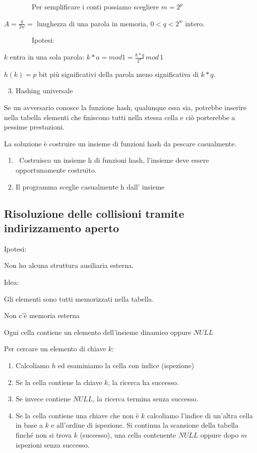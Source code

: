 \documentclass[11pt,a4paper,twoside,openright]{book}
\providecommand{\tightlist}{\setlength{\itemsep}{0pt}\setlength{\parskip}{0pt}}
\begin{document}
{~~~~~~~~Per semplificare i conti possiamo scegliere $m=2^p$}

{$A = \frac{q}{2w} = $ lunghezza di una parola in memoria, $0<q<2^w$ intero.}

{~~~~~~~~Ipotesi:}

{$k$ entra in una sola parola: $k*a = mod 1 = \frac{k*q}{2^w}\,mod\,1$}

{$h(k)=p$ bit più significativi della parola meno significativa di $k*q$.}

\begin{enumerate}
\setcounter{enumi}{2}
\tightlist
\item
  {Hashing universale}
\end{enumerate}

{Se un avversario conosce la funzione hash, qualunque essa sia, potrebbe inserire nella tabella elementi che finiscono tutti nella stessa cella e ciò porterebbe a pessime prestazioni.}

{La soluzione è costruire un insieme di funzioni hash da pescare casualmente.}

\begin{enumerate}
\tightlist
\item
  {~Costruisco un insieme h di funzioni hash, l'insieme deve essere
  opportunamente costruito.}
\item
  {Il programma sceglie casualmente h dall' insieme}
\end{enumerate}

\subsection{Risoluzione delle collisioni tramite indirizzamento aperto}

{Ipotesi: }

{Non ho alcuna struttura ausiliaria esterna.}

{Idea:}

{Gli elementi sono tutti memorizzati nella tabella.}

{Non c'è memoria esterna}

{Ogni cella contiene un elemento dell'insieme dinamico oppure $NULL$}

{Per cercare un elemento di chiave $k$:}

\begin{enumerate}
\tightlist
\item
  {Calcoliamo $h$ ed esaminiamo la cella con indice (ispezione)}
\item
  {Se la cella contiene la chiave $k$, la ricerca ha successo. }
\item
  {Se invece contiene $NULL$, la ricerca termina senza successo.}
\item
  {Se la cella contiene una chiave che non è $k$ calcoliamo l'indice di un'altra cella in base a $k$ e all'ordine di ispezione. Si continua la scansione della tabella finché non si trova $k$ (successo), una cella contenente $NULL$ oppure dopo $m$ ispezioni senza successo.}
\end{enumerate}
\end{document}
